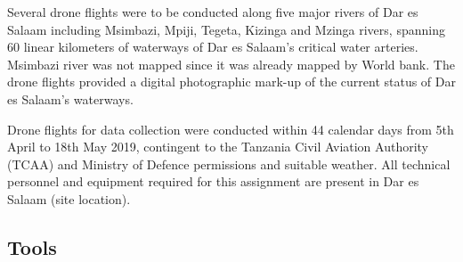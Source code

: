 \documentclass[a4paper,12pt,twoside]{article}
\begin{document}
Several drone flights were to be  conducted along five major rivers of Dar es Salaam including  Msimbazi, Mpiji, Tegeta, Kizinga and Mzinga rivers, spanning 60 linear kilometers of waterways of Dar es Salaam’s critical water arteries. Msimbazi river was not mapped since it  was  already mapped by World bank. The drone flights provided a digital photographic mark-up of the current status of Dar es Salaam’s waterways. 

Drone flights for data collection were conducted within 44 calendar days from 5th April to 18th May 2019, contingent  to the Tanzania Civil Aviation Authority (TCAA) and Ministry of Defence permissions and suitable weather. All technical personnel and equipment required for this assignment are present in Dar es Salaam (site location). 

\subsection{Tools}
\end{document}
